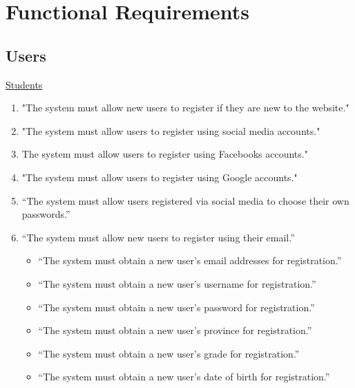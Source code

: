 \documentclass[12pt,a4paper]{article}
\begin{document}
	
	\section{Functional Requirements}
		\subsection*{Users}
		\underline{Students}
			\begin{enumerate}
				\item "The system must allow new users to register if they are new to the website."
				\item  "The system must allow users to register using social media accounts."
				\item The system must allow users to register using Facebooks accounts."
				\item "The system must allow users to register using Google accounts."
				\item “The system must allow users registered via social media to choose their own passwords.”
				\item “The system must allow new users to register using their email.”
				\begin{itemize}
					\item “The system must obtain a new user’s email addresses for registration.”
					\item  “The system must obtain a new user’s username for registration.”
					\item “The system must obtain a new user’s password for registration.”
					\item “The system must obtain a new user’s province for registration.”
					\item “The system must obtain a new user’s grade for registration.”
				\item “The system must obtain a new user’s date of birth for registration.”
				\end{itemize}
				

\end{enumerate}
\end{document}
